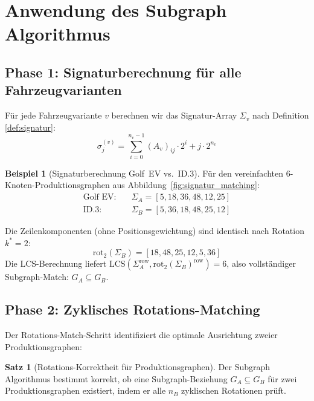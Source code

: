 ﻿\documentclass[a4paper,12pt]{article}
\theoremstyle{definition}
\newtheorem{beispiel}{Beispiel}
\newtheorem{satz}{Satz}
\begin{document}
\section{Anwendung des Subgraph Algorithmus}

\subsection{Phase 1: Signaturberechnung für alle Fahrzeugvarianten}

Für jede Fahrzeugvariante $v$ berechnen wir das Signatur-Array $\Sigma_v$
nach Definition \ref{def:signatur}:
\[
\sigma_j^{(v)} = \sum_{i=0}^{n_v-1} (A_v)_{ij} \cdot 2^i + j \cdot 2^{n_v}
\]

\begin{beispiel}[Signaturberechnung Golf~EV vs.\ ID.3]
\label{bsp:signatur_golfvs_id3}
Für den vereinfachten 6-Knoten-Produktionsgraphen aus Abbildung~\ref{fig:signatur_matching}:
\begin{align*}
\text{Golf EV}: \quad &\Sigma_A = [5, 18, 36, 48, 12, 25] \\
\text{ID.3}: \quad &\Sigma_B = [5, 36, 18, 48, 25, 12]
\end{align*}

Die Zeilenkomponenten (ohne Positionsgewichtung) sind identisch nach Rotation $k^* = 2$:
\[
\mathrm{rot}_2(\Sigma_B) = [18, 48, 25, 12, 5, 36]
\]
Die LCS-Berechnung liefert $\mathrm{LCS}(\Sigma_A^{\mathrm{row}}, \mathrm{rot}_2(\Sigma_B)^{\mathrm{row}}) = 6$,
also vollständiger Subgraph-Match: $G_A \subseteq G_B$.
\end{beispiel}

\subsection{Phase 2: Zyklisches Rotations-Matching}

Der Rotations-Match-Schritt identifiziert die optimale Ausrichtung zweier Produktionsgraphen:

\begin{satz}[Rotations-Korrektheit für Produktionsgraphen]
\label{satz:rotations_korrektheit}
Der Subgraph Algorithmus bestimmt korrekt, ob eine Subgraph-Beziehung $G_A \subseteq G_B$
für zwei Produktionsgraphen existiert, indem er alle $n_B$ zyklischen Rotationen prüft.
\end{satz}
\end{document}
